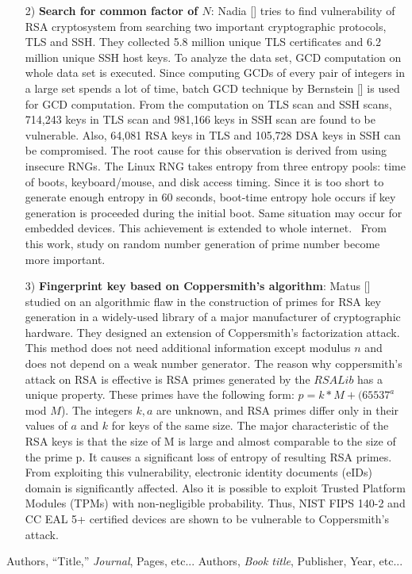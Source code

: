 \documentclass[a4paper]{article}
\begin{document}
\begin{enumerate}[label=]
       \item[2)] \textbf{Search for common factor of $N$}: Nadia [] tries to find vulnerability of RSA cryptosystem from searching two important cryptographic protocols, TLS and SSH. They collected 5.8 million unique TLS certificates and 6.2 million unique SSH host keys. To analyze the data set, GCD computation on whole data set is executed. Since computing GCDs of every pair of integers in a large set spends a lot of time, batch GCD technique by Bernstein [] is used for GCD computation. From the computation on TLS scan and SSH scans, 714,243 keys in TLS scan and 981,166 keys in SSH scan are found to be vulnerable. Also, 64,081 RSA keys in TLS and 105,728 DSA keys in SSH can be compromised. The root cause for this observation is derived from using insecure RNGs. The Linux RNG takes entropy from three entropy pools: time of boots, keyboard/mouse, and disk access timing. Since it is too short to generate enough entropy in 60 seconds, boot-time entropy hole occurs if key generation is proceeded during the initial boot. Same situation may occur for embedded devices. This achievement is extended to whole internet.~ From this work, study on random number generation of prime number become more important.
       
       \item[3)] \textbf{Fingerprint key based on Coppersmith's algorithm}: Matus [] studied on an algorithmic flaw in the construction of primes for RSA key generation in a widely-used library of a major manufacturer of cryptographic hardware. They designed an extension of Coppersmith's factorization attack. This method does not need additional information except modulus $n$ and does not depend on a weak number generator. The reason why coppersmith's attack on RSA is effective is RSA primes generated by the $RSALib$ has a unique property. These primes have the following form: $p=k*M + (65537^a$ mod $M$). The integers $k,a$ are unknown, and RSA primes differ only in their values of $a$ and $k$ for keys of the same size. The major characteristic of the RSA keys is that the size of M is large and almost comparable to the size of the prime p. It causes a significant loss of entropy of resulting RSA primes. From exploiting this vulnerability, electronic identity documents (eIDs) domain is significantly affected. Also it is possible to exploit Trusted Platform Modules (TPMs) with non-negligible probability. Thus, NIST FIPS 140-2 and CC EAL 5+ certified devices are shown to be vulnerable to Coppersmith's attack.
\end{enumerate}

\begin{thebibliography}{9}
Authors, ``Title,'' {\em Journal}, Pages, etc...
Authors, {\em Book title}, Publisher, Year, etc...
\end{thebibliography}
\end{document}

